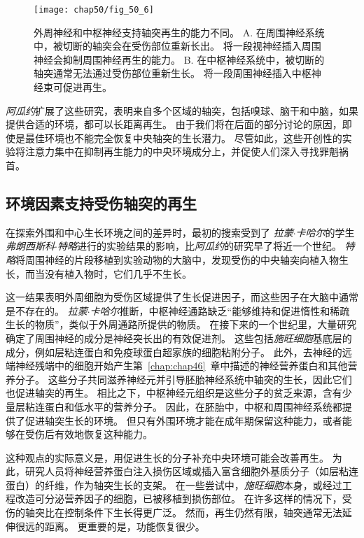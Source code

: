 \begin{figure}[htbp]
	\centering
	\texttt{[image: chap50/fig\_50\_6]}
	\caption{外周神经和中枢神经支持轴突再生的能力不同。
		A. 在周围神经系统中，被切断的轴突会在受伤部位重新长出。
		将一段视神经插入周围神经会抑制周围神经再生的能力。
		B. 在中枢神经系统中，被切断的轴突通常无法通过受伤部位重新生长。
		将一段周围神经插入中枢神经束可促进再生。}
	\label{fig:50_6}
\end{figure}


\textit{阿瓜约}扩展了这些研究，表明来自多个区域的轴突，包括嗅球、脑干和中脑，如果提供合适的环境，都可以长距离再生。
由于我们将在后面的部分讨论的原因，即使是最佳环境也不能完全恢复中央轴突的生长潜力。
尽管如此，这些开创性的实验将注意力集中在抑制再生能力的中央环境成分上，并促使人们深入寻找罪魁祸首。



\subsection{环境因素支持受伤轴突的再生}

在探索外围和中心生长环境之间的差异时，最初的搜索受到了 \textit{拉蒙$\cdot$卡哈尔}的学生\textit{弗朗西斯科$\cdot$特略}进行的实验结果的影响，比\textit{阿瓜约}的研究早了将近一个世纪。
\textit{特略}将周围神经的片段移植到实验动物的大脑中，发现受伤的中央轴突向植入物生长，而当没有植入物时，它们几乎不生长。


这一结果表明外周细胞为受伤区域提供了生长促进因子，而这些因子在大脑中通常是不存在的。
\textit{拉蒙$\cdot$卡哈尔}推断，中枢神经通路缺乏“能够维持和促进惰性和稀疏生长的物质”，类似于外周通路所提供的物质。
在接下来的一个世纪里，大量研究确定了周围神经的成分是神经突长出的有效促进剂。
这些包括\textit{施旺细胞}基底层的成分，例如层粘连蛋白和免疫球蛋白超家族的细胞粘附分子。
此外，去神经的远端神经残端中的细胞开始产生第~\ref{chap:chap46}~章中描述的神经营养蛋白和其他营养分子。
这些分子共同滋养神经元并引导胚胎神经系统中轴突的生长，因此它们也促进轴突的再生。
相比之下，中枢神经元组织是这些分子的贫乏来源，含有少量层粘连蛋白和低水平的营养分子。
因此，在胚胎中，中枢和周围神经系统都提供了促进轴突生长的环境。
但只有外围环境才能在成年期保留这种能力，或者能够在受伤后有效地恢复这种能力。


这种观点的实际意义是，用促进生长的分子补充中央环境可能会改善再生。
为此，研究人员将神经营养蛋白注入损伤区域或插入富含细胞外基质分子（如层粘连蛋白）的纤维，作为轴突生长的支架。
在一些尝试中，\textit{施旺细胞}本身，或经过工程改造可分泌营养因子的细胞，已被移植到损伤部位。
在许多这样的情况下，受伤的轴突比在控制条件下生长得更广泛。
然而，再生仍然有限，轴突通常无法延伸很远的距离。
更重要的是，功能恢复很少。



